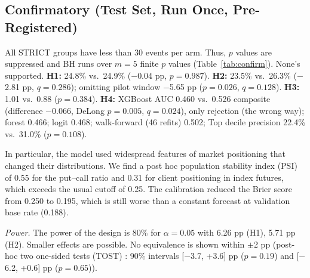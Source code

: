\documentclass[conference]{IEEEtran}
\begin{document}
\subsection{Confirmatory (Test Set, Run Once, Pre-Registered)}
All STRICT groups have less than 30 events per arm. Thus, $p$ values are suppressed and BH runs over $m=5$
finite $p$ values (Table~\ref{tab:confirm}). None's supported. \textbf{H1:} 24.8\% vs.\ 24.9\%
(\ensuremath{-}0.04 pp, $p=0.987$). \textbf{H2:} 23.5\% vs.\ 26.3\% (\ensuremath{-}2.81 pp, $q=0.286$);
omitting pilot window \ensuremath{-}5.65 pp ($p=0.026$, $q=0.128$). \textbf{H3:} 1.01 vs.\ 0.88 ($p=0.384$).
\textbf{H4:} XGBoost AUC 0.460 vs.\ 0.526 composite (difference \ensuremath{-}0.066, DeLong $p=0.005$,
$q=0.024$), only rejection (the wrong way); forest 0.466; logit 0.468; walk-forward (46 refits) 0.502; Top
decile precision 22.4\% vs.\ 31.0\% ($p=0.108$).

In particular, the model used widespread features of market positioning that changed their distributions.
We find a post hoc population stability index (PSI) of 0.55 for the put--call ratio and 0.31 for client
positioning in index futures, which exceeds the usual cutoff of 0.25. The calibration reduced the Brier score
\cite{brier1950} from 0.250 to 0.195, which is still worse than a constant forecast at validation base rate
(0.188).

\emph{Power.} The power of the design is 80\% for $\alpha=0.05$ with 6.26 pp (H1), 5.71 pp (H2). Smaller
effects are possible. No equivalence is shown within $\pm$2 pp (post-hoc two one-sided tests (TOST)
\cite{lakens2017}: 90\% intervals [\ensuremath{-}3.7, +3.6] pp ($p=0.19$) and [\ensuremath{-}6.2, +0.6] pp
($p=0.65$)).
\end{document}

